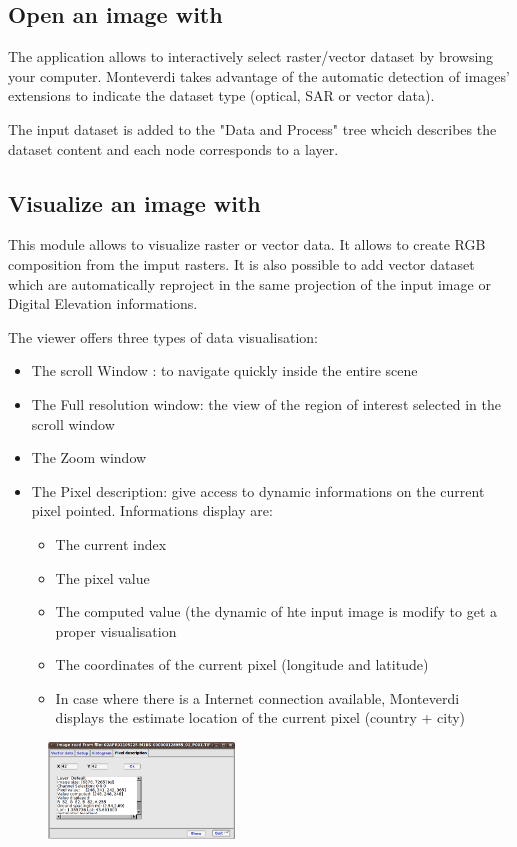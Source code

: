 \subsection{Open an image with \mont}
The application allows to interactively select raster/vector dataset by browsing your computer. Monteverdi takes
advantage of the automatic detection of images' extensions to indicate the dataset type (optical, SAR or vector data).   

The input dataset is added to the "Data and Process" tree whcich describes the dataset content and each node corresponds to a layer.

\subsection{Visualize an image with \mont}
This module allows to visualize raster or vector data. It allows to create RGB composition from the imput rasters. It is also possible to add 
vector dataset which are automatically reproject in the same projection of the input image or Digital Elevation informations. 

The viewer offers three types of data visualisation: 

\begin{itemize}
\item The scroll Window : to navigate quickly inside the entire scene
\item The Full resolution window: the view of the region of interest selected in the scroll window 
\item The Zoom window
\item The Pixel description: give access to dynamic informations on the current pixel pointed. Informations display are:
  \begin{itemize}
  \item The current index
  \item The pixel value 
  \item The computed value (the dynamic of hte input image is modify to get a proper visualisation
  \item The coordinates of the current pixel (longitude and latitude)
  \item In case where there is a Internet connection available, Monteverdi displays the estimate location of the current pixel (country + city)  
  \end{itemize} 
\end{itemize}

\begin{figure}
  \center
  \includegraphics[width=0.44\textwidth]{../Art/MonteverdiImages/monteverdi_viewer_pixel_description.png}
  \label{fig:viewerpixeldescription}
\end{figure}

